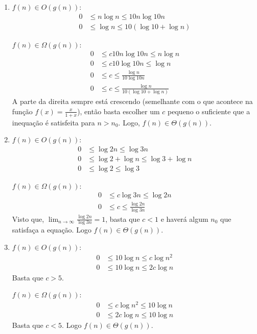 \documentclass{article}
\begin{document}
\begin{enumerate}
\begin{enumerate}
		\item $f(n) \in O(g(n))$:
		\begin{align*}
			0 &\le n \log n \le 10n \log 10n \\
			0 &\le \log n \le 10 (\log 10 + \log n)
		\end{align*}

		$f(n) \in \Omega(g(n))$:
		\begin{align*}
			0 &\le c10n \log 10n \le n \log n \\
			0 &\le c10 \log 10n \le \log n \\
			0 &\le c \le \frac{\log n}{10 \log 10n} \\
			0 &\le c \le \frac{\log n}{10 (\log 10 + \log n)}
		\end{align*}
		A parte da direita sempre está crescendo (semelhante com o que acontece
		na função $f(x)=\frac{x}{1+x}$), então basta escolher um $c$ pequeno o
		suficiente que a inequação é satisfeita para $n>n_0$. Logo, $f(n) \in
		\Theta(g(n))$.

		\item $f(n) \in O(g(n))$:
		\begin{align*}
			0 &\le \log 2n \le \log 3n \\
			0 &\le \log 2 + \log n \le \log 3 + \log n \\
			0 &\le \log 2 \le \log 3
		\end{align*}

		$f(n) \in \Omega(g(n))$:
		\begin{align*}
			0 &\le c \log 3n \le \log 2n \\
			0 &\le c \le \frac{\log 2n}{\log 3n}
		\end{align*}
		Visto que, $\lim_{n\to\infty}\frac{\log 2n}{\log 3n}=1$, basta que
		$c<1$ e haverá algum $n_0$ que satisfaça a equação. Logo $f(n) \in
		\Theta(g(n))$.

		\item $f(n) \in O(g(n))$:
		\begin{align*}
			0 &\le 10 \log n \le c \log n^2 \\
			0 &\le 10 \log n \le 2c \log n
		\end{align*}
		Basta que $c>5$.

		$f(n) \in \Omega(g(n))$:
		\begin{align*}
			0 &\le c \log n^2 \le 10 \log n \\
			0 &\le 2c \log n \le 10 \log n
		\end{align*}
		Basta que $c<5$. Logo $f(n) \in \Theta(g(n))$.


\end{enumerate}
\end{enumerate}
\end{document}
